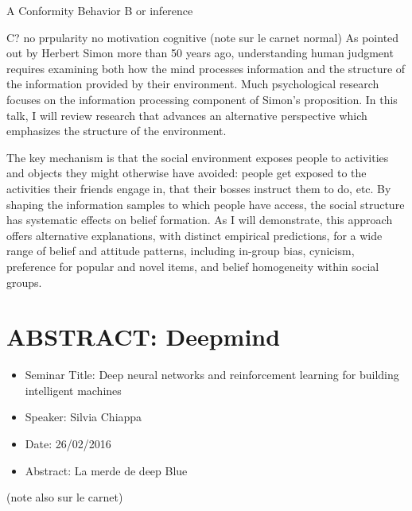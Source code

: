 \documentclass[10pt,letterpaper]{article}
\begin{document}
A Conformity Behavior
B or inference

C? no prpularity no motivation cognitive
(note sur le carnet normal)
As pointed out by Herbert Simon more than 50 years ago, understanding human judgment requires examining both how the mind processes information and the structure of the information provided by their environment. Much psychological research focuses on the information processing component of Simon’s proposition. In this talk, I will review research that advances an alternative perspective which emphasizes the structure of the environment. 

The key mechanism is that the social environment exposes people to activities and objects they might otherwise have avoided: people get exposed to the activities their friends engage in, that their bosses instruct them to do, etc. By shaping the information samples to which people have access, the social structure has systematic effects on belief formation. As I will demonstrate, this approach offers alternative explanations, with distinct empirical predictions, for a wide range of belief and attitude patterns, including in-group bias, cynicism, preference for popular and novel items, and belief homogeneity within social groups. 

\section{ABSTRACT: Deepmind}
\begin{itemize}
    \item Seminar Title: Deep neural networks and reinforcement learning for building intelligent machines
    \item Speaker: Silvia Chiappa
    \item Date: 26/02/2016
    \item Abstract: La merde de deep Blue
\end{itemize}
(note also sur le carnet)
\end{document}

